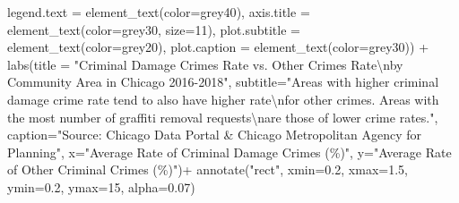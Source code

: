 \documentclass[
]{report}
\newenvironment{Shaded}{}{}
\newcommand{\AttributeTok}[1]{\textcolor[rgb]{0.84,0.23,0.29}{#1}}
\newcommand{\DecValTok}[1]{\textcolor[rgb]{0.00,0.36,0.77}{#1}}
\newcommand{\FloatTok}[1]{\textcolor[rgb]{0.00,0.36,0.77}{#1}}
\newcommand{\FunctionTok}[1]{\textcolor[rgb]{0.44,0.26,0.76}{#1}}
\newcommand{\NormalTok}[1]{\textcolor[rgb]{0.14,0.16,0.18}{#1}}
\newcommand{\SpecialCharTok}[1]{\textcolor[rgb]{0.00,0.36,0.77}{#1}}
\newcommand{\StringTok}[1]{\textcolor[rgb]{0.01,0.18,0.38}{#1}}
\begin{document}
\begin{Shaded}
\begin{Highlighting}[]
        \AttributeTok{legend.text =} \FunctionTok{element\_text}\NormalTok{(}\AttributeTok{color=}\StringTok{\textquotesingle{}grey40\textquotesingle{}}\NormalTok{),}
        \AttributeTok{axis.title =} \FunctionTok{element\_text}\NormalTok{(}\AttributeTok{color=}\StringTok{\textquotesingle{}grey30\textquotesingle{}}\NormalTok{, }\AttributeTok{size=}\DecValTok{11}\NormalTok{),}
        \AttributeTok{plot.subtitle =} \FunctionTok{element\_text}\NormalTok{(}\AttributeTok{color=}\StringTok{\textquotesingle{}grey20\textquotesingle{}}\NormalTok{),}
        \AttributeTok{plot.caption =} \FunctionTok{element\_text}\NormalTok{(}\AttributeTok{color=}\StringTok{\textquotesingle{}grey30\textquotesingle{}}\NormalTok{)) }\SpecialCharTok{+}
  \FunctionTok{labs}\NormalTok{(}\AttributeTok{title =} \StringTok{"Criminal Damage Crimes Rate vs. Other Crimes Rate}\SpecialCharTok{\textbackslash{}n}\StringTok{by Community Area in Chicago 2016{-}2018"}\NormalTok{,}
       \AttributeTok{subtitle=}\StringTok{"Areas with higher criminal damage crime rate tend to also have higher rate}\SpecialCharTok{\textbackslash{}n}\StringTok{for other crimes. Areas with the most number of graffiti removal requests}\SpecialCharTok{\textbackslash{}n}\StringTok{are those of lower crime rates."}\NormalTok{,}
       \AttributeTok{caption=}\StringTok{"Source: Chicago Data Portal \& Chicago Metropolitan Agency for Planning"}\NormalTok{,}
       \AttributeTok{x=}\StringTok{"Average Rate of Criminal Damage Crimes (\%)"}\NormalTok{,}
       \AttributeTok{y=}\StringTok{"Average Rate of Other Criminal Crimes (\%)"}\NormalTok{)}\SpecialCharTok{+}
  \FunctionTok{annotate}\NormalTok{(}\StringTok{"rect"}\NormalTok{, }\AttributeTok{xmin=}\FloatTok{0.2}\NormalTok{, }\AttributeTok{xmax=}\FloatTok{1.5}\NormalTok{, }\AttributeTok{ymin=}\FloatTok{0.2}\NormalTok{, }\AttributeTok{ymax=}\DecValTok{15}\NormalTok{, }\AttributeTok{alpha=}\FloatTok{0.07}\NormalTok{)}
\end{Highlighting}
\end{Shaded}
\end{document}
